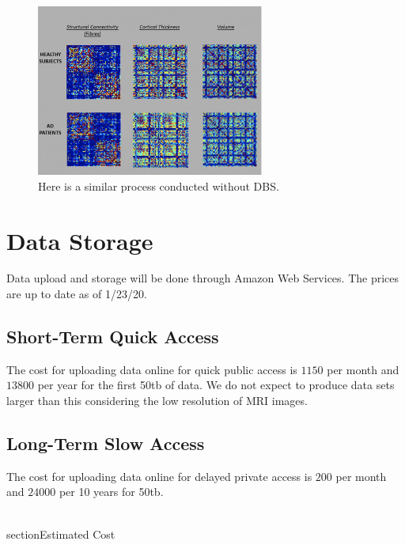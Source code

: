 \documentclass{article}
\begin{document}
\begin{figure}[h!]
\centering
\includegraphics[width=75mm, scale=1]{matrix}
\caption{Here is a similar process conducted without DBS. \cite{Pipeline}}
\label{fig:method}
\end{figure}
\section{Data Storage}
    Data upload and storage will be done through Amazon Web Services. The prices are up to date as of 1/23/20.
\subsection{Short-Term Quick Access}
    The cost for uploading data online for quick public access is $1150$ per month and $13800$ per year for the first 50tb of data. We do not expect to produce data sets larger than this considering the low resolution of MRI images. \cite{AWS}
\subsection{Long-Term Slow Access}
    The cost for uploading data online for delayed private access is $200$ per month and $24000$ per 10 years for 50tb. \cite{AWS}

\\section{Estimated Cost}
\end{document}
